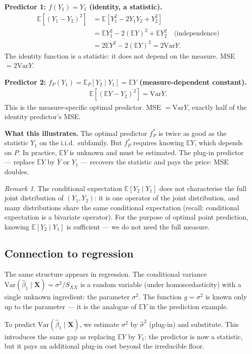 \documentclass[a4paper,oneside,12pt]{extarticle}
\theoremstyle{plain}
\theoremstyle{definition}
\theoremstyle{remark}
\newtheorem{remark}[proposition]{Remark}
\newcommand*{\E}{\mathbb{E}}
\newcommand*{\Var}{\mathrm{Var}}
\begin{document}
\textbf{Predictor 1: $f(Y_1) = Y_1$ (identity, a statistic).}
\begin{align*}
\E[(Y_1-Y_2)^2]
&= \E[Y_1^2 - 2Y_1 Y_2 + Y_2^2] \\
&= \E Y_1^2 - 2(\E Y)^2 + \E Y_2^2
  \quad\text{(independence)}\\
&= 2\E Y^2 - 2(\E Y)^2 = 2\Var Y.
\end{align*}
The identity function is a statistic: it does not depend on the
measure. MSE $= 2\Var Y$.

\textbf{Predictor 2: $f_P(Y_1) = \E_P[Y_2\mid Y_1] = \E Y$
(measure-dependent constant).}
\begin{align*}
\E[(\E Y - Y_2)^2] = \Var Y.
\end{align*}
This is the measure-specific optimal predictor. MSE $= \Var Y$,
exactly half of the identity predictor's MSE.

\textbf{What this illustrates.}
The optimal predictor $f_P^*$ is twice as good as the statistic $Y_1$
on the i.i.d.\ subfamily. But $f_P^*$ requires knowing $\E Y$, which
depends on $P$. In practice, $\E Y$ is unknown and must be estimated.
The plug-in predictor --- replace $\E Y$ by $\bar Y$ or $Y_1$ ---
recovers the statistic and pays the price: MSE doubles.

\begin{remark}
The conditional expectation $\E[Y_2 \mid Y_1]$ does not characterise
the full joint distribution of $(Y_1,Y_2)$: it is one operator of the
joint distribution, and many distributions share the same conditional
expectation (recall: conditional expectation is a bivariate operator).
For the purpose of optimal point prediction, knowing $\E[Y_2 \mid Y_1]$
is sufficient --- we do not need the full measure.
\end{remark}

\subsection{Connection to regression}

The same structure appears in regression. The conditional variance
$\Var(\hat\beta_1 \mid \mathbf{X}) = \sigma^2/S_{XX}$ is a random
variable (under homoscedasticity) with a single unknown ingredient:
the parameter $\sigma^2$. The function $g = \sigma^2$ is known only
up to the parameter --- it is the analogue of $\E Y$ in the prediction
example.

To predict $\Var(\hat\beta_1 \mid \mathbf{X})$, we estimate $\sigma^2$
by $\hat\sigma^2$ (plug-in) and substitute. This introduces the same
gap as replacing $\E Y$ by $Y_1$: the predictor is now a statistic,
but it pays an additional plug-in cost beyond the irreducible floor.

\end{document}
